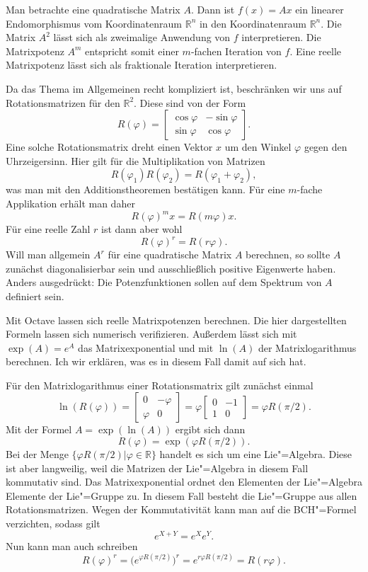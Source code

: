 \documentclass[a4paper,11pt,fleqn,twocolumn,twoside,dvipdfmx]{scrartcl}
\begin{document}
Man betrachte eine quadratische Matrix $A$. Dann ist
$f(x)=Ax$ ein linearer Endomorphismus vom Koordinatenraum
$\mathbb R^n$ in den Koordinatenraum $\mathbb R^n$. Die Matrix
$A^2$ lässt sich als zweimalige Anwendung von $f$ interpretieren.
Die Matrixpotenz $A^m$ entspricht somit einer $m$-fachen Iteration
von $f$. Eine reelle Matrixpotenz lässt sich als fraktionale
Iteration interpretieren.

Da das Thema im Allgemeinen recht kompliziert ist, beschränken wir
uns auf Rotationsmatrizen für den $\mathbb R^2$. Diese sind von der
Form
\[R(\varphi) = \begin{bmatrix}
\cos\varphi & -\sin\varphi\\
\sin\varphi & \cos\varphi
\end{bmatrix}.\]
Eine solche Rotationsmatrix dreht einen Vektor $x$ um den
Winkel $\varphi$ gegen den Uhrzeigersinn. Hier gilt für
die Multiplikation von Matrizen
\[R(\varphi_1)R(\varphi_2) = R(\varphi_1+\varphi_2),\]
was man mit den Additionstheoremen bestätigen kann.
Für eine $m$-fache Applikation erhält man daher
\[R(\varphi)^m x = R(m\varphi)x.\]
Für eine reelle Zahl $r$ ist dann aber wohl
\[R(\varphi)^r = R(r\varphi).\]
Will man allgemein $A^r$ für eine quadratische Matrix $A$
berechnen, so sollte $A$ zunächst diagonalisierbar sein und
ausschließlich positive Eigenwerte haben. Anders ausgedrückt:
Die Potenzfunktionen sollen auf dem Spektrum von $A$ definiert
sein.

Mit Octave lassen sich reelle Matrixpotenzen berechnen. Die hier
dargestellten Formeln lassen sich numerisch verifizieren.
Außerdem lässt sich mit $\exp(A)=e^A$ das Matrixexponential
und mit $\ln(A)$ der Matrixlogarithmus berechnen.
Ich wir erklären, was es in diesem Fall damit auf sich hat.

Für den Matrixlogarithmus einer Rotationsmatrix gilt zunächst einmal
\[\ln(R(\varphi))
= \begin{bmatrix}
0 & -\varphi\\
\varphi & 0
\end{bmatrix}
= \varphi\begin{bmatrix}
0 & -1\\
1 & 0
\end{bmatrix} = \varphi R(\pi/2).
\]
Mit der Formel $A=\exp(\ln(A))$ ergibt sich dann
\[R(\varphi) = \exp(\varphi R(\pi/2)).\]
Bei der Menge $\{\varphi R(\pi/2)|\varphi\in\mathbb R\}$
handelt es sich um eine Lie"=Algebra. Diese ist aber langweilig,
weil die Matrizen der Lie"=Algebra in diesem Fall kommutativ sind.
Das Matrixexponential ordnet den Elementen der Lie"=Algebra Elemente
der Lie"=Gruppe zu. In diesem Fall besteht die Lie"=Gruppe aus allen
Rotationsmatrizen. Wegen der Kommutativität kann man auf die
BCH"=Formel verzichten, sodass gilt
\[e^{X+Y} = e^X e^Y.\]
Nun kann man auch schreiben
\[R(\varphi)^r = \big(e^{\varphi R(\pi/2)}\big)^r
= e^{r\varphi R(\pi/2)} = R(r\varphi).\]
\end{document}
